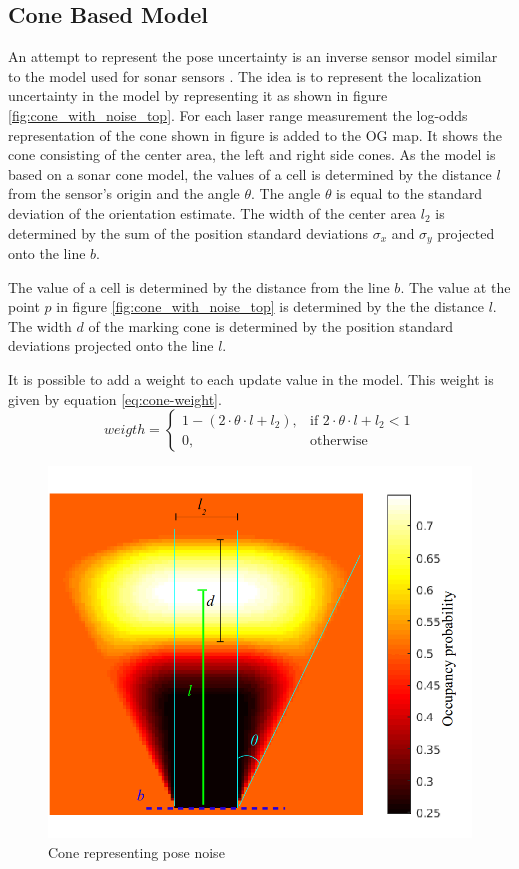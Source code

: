 \subsection{Cone Based Model}
An attempt to represent the pose uncertainty is an inverse sensor model similar to the model used for sonar sensors  \cite{probRob}.  
The idea is to represent the localization uncertainty in the model by representing it as shown in figure \vref{fig:cone_with_noise_top}.
For each laser range measurement the log-odds representation of the cone shown in figure is added to the OG map.
It shows the cone consisting of the center area, the left and right side cones. 
As the model is based on a sonar cone model, the values of a cell is determined by the distance \(l\) from the sensor's origin and the angle \(\theta\). 
The angle \(\theta\) is equal to the standard deviation of the orientation estimate. 
The width of the center area $l_2$ is determined by the sum of the position standard deviations $\sigma_x$ and $\sigma_y$ projected onto the line $b$. 

The value of a cell is determined by the distance from the line $b$. 
The value at the point $p$ in figure \vref{fig:cone_with_noise_top} is determined by the the distance \(l\).
The width $d$ of the marking cone is determined by the position standard deviations projected onto the line $l$.

It is possible to add a weight to each update value in the model. This weight is given by equation \vref{eq:cone-weight}.
\begin{equation}
\label{eq:cone-weight}
weigth = 
\begin{cases}
1 - ( 2 \cdot \theta \cdot l + l_2), & \text{if } 2 \cdot \theta \cdot l + l_2 < 1\\
0, & \text{otherwise}
\end{cases}
\end{equation}

\begin{figure}[htbp]
	\centering
	\includegraphics[width=\textwidth]{figures/static_mapping/cone_noise_top}
	\caption{Cone representing pose noise }
	\label{fig:cone_with_noise_top}
\end{figure}

